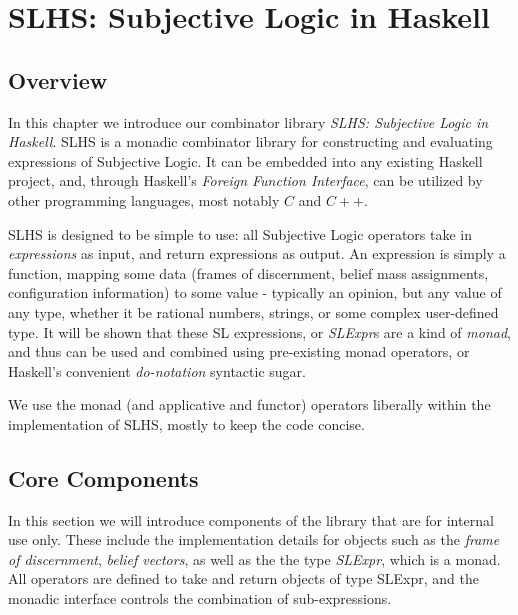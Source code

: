 \documentclass[thesis.tex]{subfiles}
\begin{document}
\chapter{SLHS: Subjective Logic in Haskell}
\label{chap:sl-in-haskell}


\section{Overview}

In this chapter we introduce our combinator library \emph{SLHS:
  Subjective Logic in Haskell}. SLHS is a monadic combinator library
for constructing and evaluating expressions of Subjective Logic. It
can be embedded into any existing Haskell project, and, through
Haskell's \emph{Foreign Function Interface}, can be utilized by other
programming languages, most notably $C$ and $C++$.

SLHS is designed to be simple to use: all Subjective Logic operators
take in \emph{expressions} as input, and return expressions as output.
An expression is simply a function, mapping some data (frames of
discernment, belief mass assignments, configuration information) to
some value - typically an opinion, but any value of any type, whether
it be rational numbers, strings, or some complex user-defined type.
It will be shown that these SL expressions, or \emph{SLExpr}s are a
kind of \emph{monad}, and thus can be used and combined using
pre-existing monad operators, or Haskell's convenient \emph{do-notation}
syntactic sugar.

We use the monad (and applicative and functor) operators liberally
within the implementation of SLHS, mostly to keep the code concise.


\section{Core Components}

In this section we will introduce components of the library that
are for internal use only. These include the implementation details
for objects such as the \emph{frame of discernment}, \emph{belief
  vectors}, as well as the the type \emph{SLExpr}, which is a monad.
All operators are defined to take and return objects of type
SLExpr, and the monadic interface controls the combination of
sub-expressions.








\end{document}
